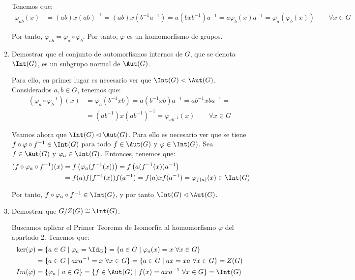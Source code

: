 \begin{ejercicio}
\begin{enumerate}
        Tenemos que:
        \begin{align*}
            \varphi_{ab}(x) &= (ab)x(ab)^{-1} = (ab)x(b^{-1}a^{-1}) = a(bxb^{-1})a^{-1} = a\varphi_b(x)a^{-1} = \varphi_a(\varphi_b(x))\qquad \forall x\in G
        \end{align*}

        Por tanto, $\varphi_{ab} = \varphi_a\circ\varphi_b$. Por tanto, $\varphi$ es un homomorfismo de grupos.


        \item Demostrar que el conjunto de automorfismos internos de $G$, que se denota $\Int(G)$, es un subgrupo normal de $\Aut(G)$.
        
        Para ello, en primer lugar es necesario ver que $\Int(G)<\Aut(G)$. Considerados $a,b\in G$, tenemos que:
        \begin{align*}
            (\varphi_a\circ \varphi^{-1}_b)(x) &= \varphi_a\left(b^{-1}xb\right) = a\left(b^{-1}xb\right)a^{-1} = ab^{-1}xba^{-1}
            =\\&= (ab^{-1})x(ab^{-1})^{-1} = \varphi_{ab^{-1}}(x)\qquad \forall x\in G
        \end{align*}
        
        Veamos ahora que $\Int(G)\lhd \Aut(G)$. Para ello es necesario ver que se tiene $f\circ \varphi \circ f^{-1}\in \Int(G)$ para todo $f\in \Aut(G)$ y $\varphi\in \Int(G)$.
        Sea $f\in \Aut(G)$ y $\varphi_a\in \Int(G)$. Entonces, tenemos que:
        \begin{align*}
            (f\circ \varphi_a \circ f^{-1})(x) &= f\left(\varphi_a(f^{-1}(x))\right) = f\left(a(f^{-1}(x))a^{-1}\right)\\
            &= f(a)f(f^{-1}(x))f(a^{-1}) = f(a)xf(a^{-1}) = \varphi_{f(a)}(x)\in \Int(G)
        \end{align*}

        Por tanto, $f\circ \varphi_a \circ f^{-1}\in \Int(G)$, y por tanto $\Int(G)\lhd \Aut(G)$.
        \item Demostrar que $G/Z(G)\cong \Int(G)$.
        
        Buscamos aplicar el Primer Teorema de Isomorfía al homomorfismo $\varphi$ del apartado 2. Tenemos que:
        \begin{align*}
            \ker(\varphi) &= \{a\in G\mid \varphi_a = \Id_{G}\} = \{a\in G\mid \varphi_a(x) = x\ \forall x\in G\}\\
            &= \{a\in G\mid axa^{-1} = x\ \forall x\in G\}
            = \{a\in G\mid ax=xa\ \forall x\in G\} = Z(G)\\
        Im(\varphi) &= \{\varphi_a\mid a\in G\} = \{f\in \Aut(G)\mid f(x) = axa^{-1}\ \forall x\in G\} = \Int(G)
        \end{align*}


\end{enumerate}
\end{ejercicio}
